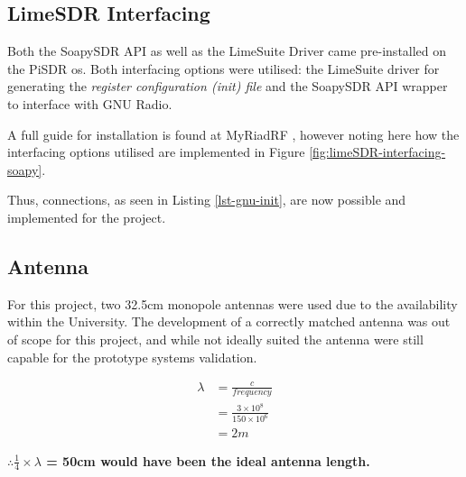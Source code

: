 \documentclass[class=report,11pt,crop=false]{standalone}
\begin{document}
\subsection{LimeSDR Interfacing}
Both the SoapySDR \gls{API} as well as the LimeSuite Driver came pre-installed on the PiSDR \gls{os}. Both interfacing options were utilised: the LimeSuite driver for generating the \emph{register configuration (init) file} and the SoapySDR \gls{API} wrapper to interface with GNU Radio. 

A full guide for installation is found at MyRiadRF \cite{myriad}, however noting here how the interfacing options utilised are implemented in Figure \ref{fig:limeSDR-interfacing-soapy}.  

Thus, connections, as seen in  Listing \ref{lst-gnu-init}, are now possible and implemented for the project.

\subsection{Antenna}
For this project, two 32.5cm monopole antennas were used due to the availability within the University. The development of a correctly matched antenna was out of scope for this project, and while not ideally suited the antenna were still capable for the prototype systems validation.

\begin{equation*}
\begin{split}
    \lambda & = \frac{c}{frequency} \\
    & = \frac{3 \times 10^8}{150 \times 10^6} \\
    & = 2 m 
\end{split}
\end{equation*}

\textbf{$\therefore \frac{1}{4} \times \lambda$ = 50cm  would have been the ideal antenna length.}
\end{document}
